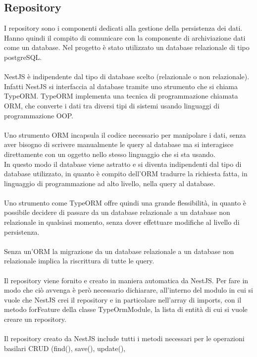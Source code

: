 \subsection{Repository}
I repository sono i componenti dedicati alla gestione della persistenza dei dati. Hanno quindi il compito di
comunicare con la componente di archiviazione dati come un database. Nel progetto è stato utilizzato un database
relazionale di tipo postgreSQL.
\\\\
NestJS è indipendente dal tipo di database scelto (relazionale o non relazionale). Infatti NestJS si interfaccia
al database tramite uno strumento che si chiama TypeORM. TypeORM implementa una tecnica di programmazione chiamata 
\gls{ORM}\glsfirstoccur, che converte i dati tra diversi tipi di sistemi usando linguaggi di programmazione \gls{OOP}\glsfirstoccur.
\\\\
Uno strumento \gls{ORM} incapsula il codice necessario per manipolare i dati, senza aver bisogno di scrivere manualmente
le query al database ma si interagisce direttamente con un oggetto nello stesso linguaggio che si sta usando. 
\\
In questo modo il database viene astratto e si diventa indipendenti dal tipo di database utilizzato, in quanto è compito dell'\gls{ORM}
tradurre la richiesta fatta, in linguaggio di programmazione ad alto livello, nella query al database. 
\\\\
Uno strumento come TypeORM offre quindi una grande flessibilità, in quanto è possibile decidere di passare da un database
relazionale a un database non relazionale in qualsiasi momento, senza dover effettuare modifiche al livello di persistenza.
\\\\
Senza un'\gls{ORM} la migrazione da un database relazionale a un database non relazionale implica la riscrittura di tutte le query.
\\\\
Il repository viene fornito e creato in maniera automatica da NestJS. Per fare in modo che ciò avvenga è però necessario
dichiarare, all'interno del modulo in cui si vuole che NestJS crei il repository e in particolare nell'array di imports, con 
il metodo forFeature della classe TypeOrmModule, la lista di entità di cui si vuole creare un repository.
\\\\
Il repository creato da NestJS include tutti i metodi necessari per le operazioni basilari \gls{CRUD} (find(), save(), update(), 
